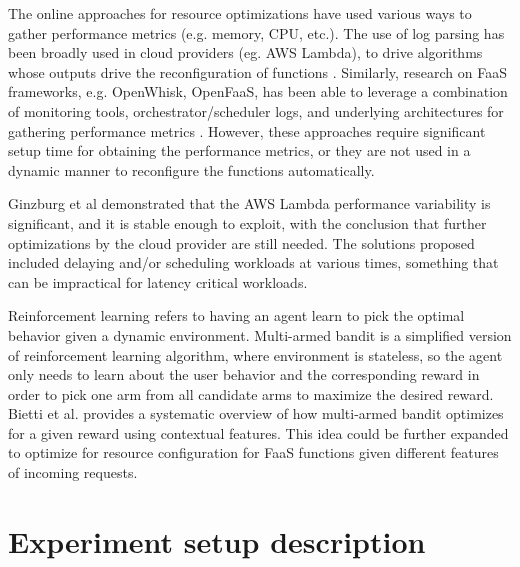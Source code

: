 \documentclass[conference]{IEEEtran}
\begin{document}
The online approaches for resource optimizations have used various ways to gather performance metrics (e.g. memory, CPU, etc.). The use of log parsing has been broadly used in cloud providers (eg. AWS Lambda), to drive algorithms whose outputs drive the reconfiguration of functions \cite{10063937, 9860980}. Similarly, research on FaaS frameworks, e.g. OpenWhisk, OpenFaaS, has been able to leverage a combination of monitoring tools, orchestrator/scheduler logs, and underlying architectures for gathering performance metrics \cite{9582234, 10.1145/3472883.3486992, 9946331}. However, these approaches require significant setup time for obtaining the performance metrics, or they are not used in a dynamic manner to reconfigure the functions automatically.

Ginzburg et al \cite{10.1145/3429880.3430099} demonstrated that the AWS Lambda performance variability is significant, and it is stable enough to exploit, with the conclusion that further optimizations by the cloud provider are still needed. The solutions proposed included delaying and/or scheduling workloads at various times, something that can be impractical for latency critical workloads.

Reinforcement learning refers to having an agent learn to pick the optimal behavior given a dynamic environment. Multi-armed bandit is a simplified version of reinforcement learning algorithm, where environment is stateless, so the agent only needs to learn about the user behavior and the corresponding reward in order to pick one arm from all candidate arms to maximize the desired reward. Bietti et al. \cite{10.5555/3546258.3546391} provides a systematic overview of how multi-armed bandit optimizes for a given reward using contextual features. This idea could be further expanded to optimize for resource configuration for FaaS functions given different features of incoming requests.

\vspace{12pt}



\section{Experiment setup description}
\end{document}
